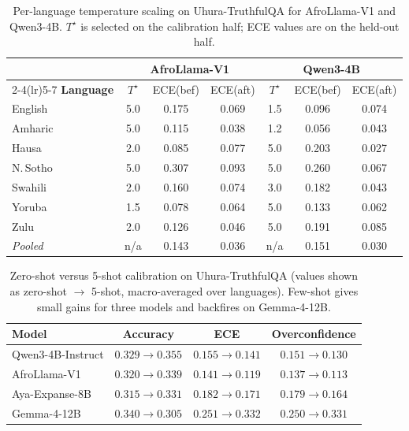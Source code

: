 \documentclass[pmlr]{jmlr}%
\begin{document}
\begin{table}[H]\centering\small
\caption{Per-language temperature scaling on Uhura-TruthfulQA for AfroLlama-V1 and Qwen3-4B.
$T^\star$ is selected on the calibration half; ECE values are on the held-out half.}
\label{tab:temp_scaling}
\begin{tabular}{lcccccc}
\toprule
 & \multicolumn{3}{c}{\textbf{AfroLlama-V1}} & \multicolumn{3}{c}{\textbf{Qwen3-4B}}\\
\cmidrule(lr){2-4}\cmidrule(lr){5-7}
\textbf{Language} & $T^\star$ & ECE(bef) & ECE(aft) & $T^\star$ & ECE(bef) & ECE(aft)\\
\midrule
English   & 5.0 & 0.175 & 0.069 & 1.5 & 0.096 & 0.074\\
Amharic   & 5.0 & 0.115 & 0.038 & 1.2 & 0.056 & 0.043\\
Hausa     & 2.0 & 0.085 & 0.077 & 5.0 & 0.203 & 0.027\\
N.\,Sotho & 5.0 & 0.307 & 0.093 & 5.0 & 0.260 & 0.067\\
Swahili   & 2.0 & 0.160 & 0.074 & 3.0 & 0.182 & 0.043\\
Yoruba    & 1.5 & 0.078 & 0.064 & 5.0 & 0.133 & 0.062\\
Zulu      & 2.0 & 0.126 & 0.046 & 5.0 & 0.191 & 0.085\\
\midrule
\textit{Pooled} & n/a & 0.143 & 0.036 & n/a & 0.151 & 0.030\\
\bottomrule
\end{tabular}
\end{table}

\begin{table}[H]\centering\small
\caption{Zero-shot versus 5-shot calibration on Uhura-TruthfulQA (values shown as zero-shot
$\rightarrow$ 5-shot, macro-averaged over languages). Few-shot gives small gains for three models and
backfires on Gemma-4-12B.}
\label{tab:fewshot}
\begin{tabular}{lccc}
\toprule
\textbf{Model} & \textbf{Accuracy} & \textbf{ECE} & \textbf{Overconfidence}\\
\midrule
Qwen3-4B-Instruct & $0.329 \rightarrow 0.355$ & $0.155 \rightarrow 0.141$ & $0.151 \rightarrow 0.130$\\
AfroLlama-V1      & $0.320 \rightarrow 0.339$ & $0.141 \rightarrow 0.119$ & $0.137 \rightarrow 0.113$\\
Aya-Expanse-8B    & $0.315 \rightarrow 0.331$ & $0.182 \rightarrow 0.171$ & $0.179 \rightarrow 0.164$\\
Gemma-4-12B       & $0.340 \rightarrow 0.305$ & $0.251 \rightarrow 0.332$ & $0.250 \rightarrow 0.331$\\
\bottomrule
\end{tabular}
\end{table}
\end{document}
